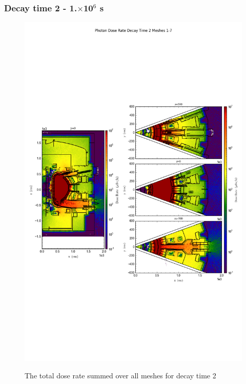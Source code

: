 \documentclass[12pt]{article}
\begin{document}
\subsubsection{Decay time 2 - 1.$\times$10$^6$ s}

\begin{figure}[ht!]
\centering
\includegraphics[trim={0cm 9cm 0cm 10cm},clip,scale=0.75]{../plots/final_model/Photon_Dose_Rate_Decay_Time_2_Meshes_1-7.png}
\label{fig:photons_dc2_no4bc_total}
\caption{The total dose rate summed over all meshes for decay time 2}
\end{figure}
\end{document}
